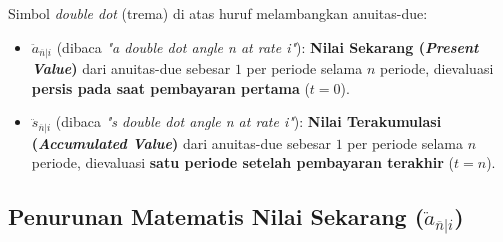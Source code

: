 \documentclass[11pt,a4paper]{article}
\begin{document}
\begin{center}
\end{center}

\begin{definitionbox}
Simbol \textit{double dot} (trema) di atas huruf melambangkan anuitas-due:
\begin{itemize}[leftmargin=1.5em]
    \item $\ddot{a}_{\overline{n}|i}$ (dibaca \textit{"a double dot angle n at rate i"}): \textbf{Nilai Sekarang (\textit{Present Value})} dari anuitas-due sebesar $1$ per periode selama $n$ periode, dievaluasi \textbf{persis pada saat pembayaran pertama} ($t = 0$).
    \item $\ddot{s}_{\overline{n}|i}$ (dibaca \textit{"s double dot angle n at rate i"}): \textbf{Nilai Terakumulasi (\textit{Accumulated Value})} dari anuitas-due sebesar $1$ per periode selama $n$ periode, dievaluasi \textbf{satu periode setelah pembayaran terakhir} ($t = n$).
\end{itemize}
\end{definitionbox}

\subsection{Penurunan Matematis Nilai Sekarang (\texorpdfstring{$\ddot{a}_{\overline{n}|i}$}{\"a\_n|i})}
\end{document}
